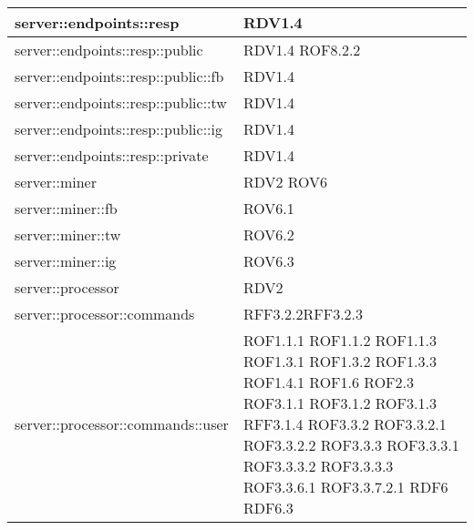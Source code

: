 \begin{center}
\begin{longtable}{| p{9cm} | p{4cm} |}
\hline
server::endpoints::resp  &  RDV1.4 \newline \\
\hline
server::endpoints::resp::public  &  RDV1.4 \newline ROF8.2.2 \newline\\
\hline
server::endpoints::resp::public::fb  &  RDV1.4 \newline\\
\hline
server::endpoints::resp::public::tw  &  RDV1.4 \newline \\
\hline
server::endpoints::resp::public::ig  &  RDV1.4 \newline \\
\hline
server::endpoints::resp::private  &  RDV1.4 \newline \\
\hline
server::miner  & RDV2 \newline ROV6 \newline \\
\hline
server::miner::fb  &  ROV6.1 \newline \\
\hline
server::miner::tw  &  ROV6.2 \newline \\
\hline
server::miner::ig  &  ROV6.3 \newline \\
\hline
server::processor  & RDV2 \newline \\
\hline
server::processor::commands  & RFF3.2.2\newline RFF3.2.3\newline \\
\hline
server::processor::commands::user  & ROF1.1.1 \newline ROF1.1.2 \newline ROF1.1.3 \newline ROF1.3.1 \newline ROF1.3.2 \newline ROF1.3.3 \newline ROF1.4.1 \newline ROF1.6 \newline ROF2.3 \newline ROF3.1.1 \newline ROF3.1.2 \newline ROF3.1.3 \newline RFF3.1.4 \newline ROF3.3.2 \newline ROF3.3.2.1 \newline ROF3.3.2.2 \newline ROF3.3.3 \newline ROF3.3.3.1 \newline ROF3.3.3.2 \newline ROF3.3.3.3 \newline ROF3.3.6.1 \newline ROF3.3.7.2.1 \newline RDF6 \newline RDF6.3 \newline \\

\end{longtable}
\end{center}
